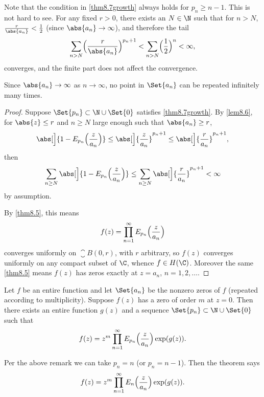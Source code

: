 \begin{remark}
	Note that the condition in \eqref{thm8.7growth} always holds for $p_n \geq n - 1$.
	This is not hard to see.
	For any fixed $r > 0$, there exists an $N \in \N$ such that for $n > N$, $\frac{r}{\abs{a_n}} < \frac{1}{2}$ (since $\abs{a_n} \to \infty$), and therefore the tail
	\[
		\sum_{n > N} \Bigl( \frac{r}{\abs{a_n}} \Bigr)^{p_n + 1} < \sum_{n > N} \Bigl(\frac{1}{2}\Bigr)^n < \infty,
	\]
	converges, and the finite part does not affect the convergence.
\end{remark}

\begin{remark}
	Since $\abs{a_n} \to \infty$ as $n \to \infty$, no point in $\Set{a_n}$ can be repeated infinitely many times.
\end{remark}

\begin{proof}
	Suppose $\Set{p_n} \subset \N \cup \Set{0}$ satisfies \eqref{thm8.7growth}.
	By \autoref{lem8.6}, for $\abs{z} \leq r$ and $n \geq N$ large enough such that $\abs{a_n} \geq r$,
	\[
		\abs[\Big]{1 - E_{p_n}\Bigl(\frac{z}{a_n}\Bigr)} \leq \abs[\Big]{\frac{z}{a_n}}^{p_n + 1} \leq \abs[\Big]{\frac{r}{a_n}}^{p_n + 1},
	\]
	then
	\[
		\sum_{n \geq N} \abs[\Big]{1 - E_{p_n}\Bigl( \frac{z}{a_n} \Bigr)} \leq \sum_{n \geq N} \abs[\Big]{\frac{r}{a_n}}^{p_n + 1} < \infty
	\]
	by assumption.

	By \autoref{thm8.5}, this means
	\[
		f(z) = \prod_{n = 1}^\infty E_{p_n}\Bigl(\frac{z}{a_n}\Bigr)
	\]
	converges uniformly on $\closure{B(0, r)}$, with $r$ arbitrary, so $f(z)$ converges uniformly on any compact subset of $\C$, whence $f \in H(\C)$.
	Moreover the same \autoref{thm8.5} means $f(z)$ has zeros exactly at $z = a_n$, $n = 1, 2, \dots$.
\end{proof}

\begin{theorem}\label{thm8.8}
	Let $f$ be an entire function and let $\Set{a_n}$ be the nonzero zeros of $f$ (repeated according to multiplicity).
	Suppose $f(z)$ has a zero of order $m$ at $z = 0$.
	Then there exists an entire function $g(z)$ and a sequence $\Set{p_n} \subset \N \cup \Set{0}$ such that
	\[
		f(z) = z^m \prod_{n = 1}^\infty E_{p_n} \Bigl( \frac{z}{a_n} \Bigr) \exp(g(z)).
	\]
\end{theorem}

\begin{remark}
	Per the above remark we can take $p_n = n$ (or $p_n = n - 1$).
	Then the theorem says
	\[
		f(z) = z^m \prod_{n = 1}^\infty E_n\Bigl(\frac{z}{a_n}\Bigr) \exp(g(z)).
	\]
\end{remark}

